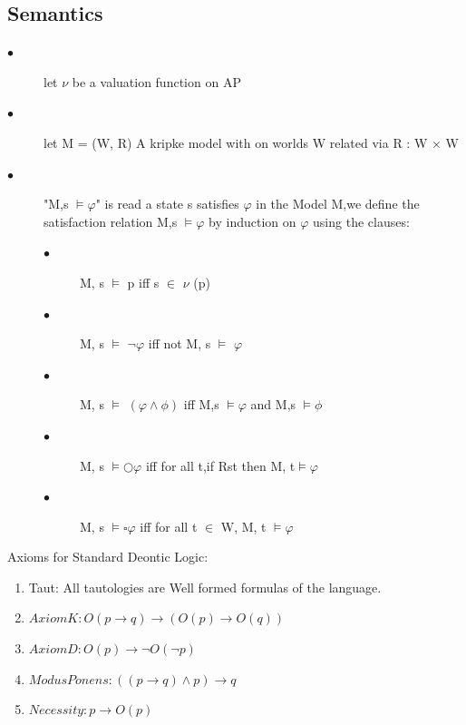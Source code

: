 \documentclass{article}
\begin{document}
\subsection{Semantics}
\begin{description}
\item[$\bullet$ ] let $\nu$ be a valuation function on AP
\item[$\bullet $]  let M = (W, R) A kripke model with on worlds W related via R : W × W
\item[$\bullet $]  "M,s $ \vDash \varphi$" is read a state s satisfies $\varphi$ in the Model M,we define the satisfaction relation M,s $ \vDash \varphi$ by induction on $\varphi$ using the clauses:
\begin{description}
\item[$\bullet$ ]M, s $ \vDash $ p iff s $\in$ $\nu$  (p)
\item[$\bullet$ ]M, s $ \vDash $ $\neg \varphi$ iff not M, s $ \vDash $ $\varphi$
\item[$\bullet$ ]M, s $ \vDash $ $(\varphi\land\phi )$ iff M,s $ \vDash \varphi$ and  M,s $ \vDash \phi$
\item[$\bullet$ ]M, s $ \vDash  \bigcirc\varphi$ iff for all t,if Rst then M, t$\vDash \varphi$
\item[$\bullet$ ]M, s $ \vDash  \square\varphi$ iff for all t $\in$ W, M, t $\vDash \varphi$
\end{description}
\end{description}
Axioms for Standard Deontic Logic:
\begin{enumerate}
\item Taut: All tautologies are Well formed formulas of the language.
\item  $Axiom K: O(p \to q) \to (O(p) \to O(q)) $
\item $ Axiom D: O(p) \to \neg O(\neg p)$
\item $Modus Ponens: ((p \to q) \land p) \to q $
\item $ Necessity: p \to O(p)$
\end{enumerate}
\end{document}
